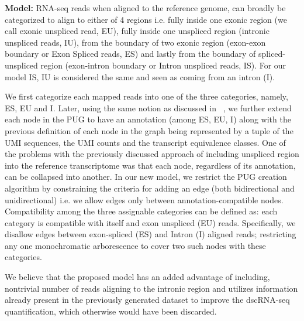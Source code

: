 \textbf{Model:} RNA-seq reads when aligned to the reference genome, can broadly be categorized to 
align to either of 4 regions i.e. fully inside one exonic region (we call exonic unspliced read, EU), 
fully inside one unspliced region (intronic unspliced reads, IU),  from the boundary of two
exonic region (exon-exon boundary or Exon Spliced reads, ES) and lastly from the boundary of 
spliced-unspliced region (exon-intron boundary or Intron unspliced reads, IS). For our
model IS, IU is considered the same and seen as coming from an intron (I).

We first categorize each mapped reads into one of the three categories, namely, ES, EU and I.
Later, using the same notion as discussed in ~, we further extend each node in the PUG 
to have an annotation (among ES, EU, I) along with the previous definition of each node in the graph
being represented by a tuple of the UMI sequences, the UMI counts and the transcript 
equivalence classes. One of the problems with the previously discussed \naive approach of including 
unspliced region into the reference transcriptome was that each node, regardless of its annotation, 
can be collapsed into another. In our new model, we restrict the PUG creation algorithm by constraining 
the criteria for adding an edge (both bidirectional and unidirectional) i.e. we allow edges only between
annotation-compatible nodes. Compatibility among the three assignable categories can be defined as:
each category is compatible with itself and exon unspliced (EU) reads. Specifically, we disallow
edges between exon-spliced (ES) and Intron (I) aligned reads; restricting any one monochromatic
arborescence to cover two such nodes with these categories.

We believe that the proposed model has an added advantage of including, nontrivial number of reads
aligning to the intronic region and utilizes information already present in the previously generated
dataset to improve the dscRNA-seq quantification, which otherwise would have been discarded.